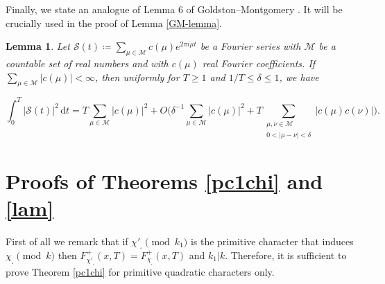 \documentclass[pdflatex]{sn-jnl}%
\newcommand{\dx}{\mathrm{d}}
\theoremstyle{sltheorems}
\newtheorem{lem}{Lemma}
\theoremstyle{plainrem}
\theoremstyle{definition}
\begin{document}
Finally, we state
an analogue of Lemma 6 of Goldston--Montgomery
\cite{GM1984}. It will be crucially used in the proof of Lemma \ref{GM-lemma}.
\begin{lem}\cite[Lemma~6]{GM1984}
\label{gmslem}
Let $\mathcal{S}(t) \coloneq \sum_{\mu \in \mathcal{M}} c(\mu) e^{2\pi i\mu t}$
be a Fourier series with $\mathcal{M}$ be a countable set of real numbers and with 
$c(\mu)$ real Fourier coefficients. 
If $\sum_{\mu \in \mathcal{M}}  \vert c(\mu) \vert  < \infty$,
then uniformly for $T\ge 1$ and $1/T\le \delta \le 1$, we have

\[
\int_{0}^{T}  \vert \mathcal{S}(t) \vert ^2 \, \dx t = 
T \sum_{\mu \in \mathcal{M}}  \vert c(\mu) \vert ^2 + 
O\Big( \delta^{-1} \sum_{\mu \in \mathcal{M}}  \vert c(\mu) \vert ^2 
+ 
T\!\! \sum_{\substack{\mu, \nu \in \mathcal{M} \\
0 <  \vert \mu-\nu \vert < \delta}}  \vert c(\mu) c(\nu) \vert \Big).
\]
\end{lem}



\section{Proofs of Theorems \ref{pc1chi} and \ref{lam}}
First of all we remark that if
 $\chi'_{_{\square}} \pmod{k_1}$ is the primitive character that induces $\chi_{_{\square}}
\pmod{k}$ then $F^+_{\chi'_{_\square}}(x,T) = F^+_{\chi_{_\square}}(x,T) $ and $k_1 | k$.
Therefore, it is sufficient to prove Theorem \ref{pc1chi} for primitive quadratic characters only.
\end{document}

